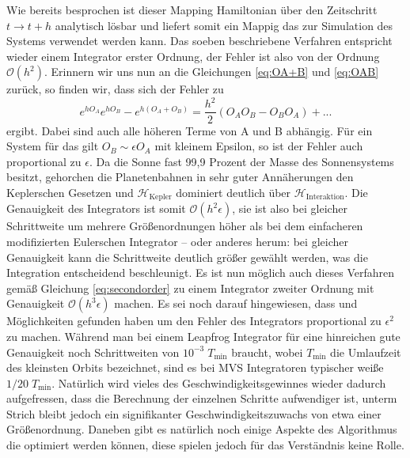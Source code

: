 \documentclass[12pt,a4paper,twoside]{article}
\renewcommand{\H}{\mathcal H}
\begin{document}
Wie bereits besprochen ist dieser Mapping Hamiltonian über den Zeitschritt $t \to t+h$ analytisch lösbar und liefert somit ein Mappig das zur Simulation des Systems verwendet werden kann.
Das soeben beschriebene Verfahren entspricht wieder einem Integrator erster Ordnung, der Fehler ist also von der Ordnung $\mathcal{O}(h^2)$.
Erinnern wir uns nun an die Gleichungen \ref{eq:OA+B} und \ref{eq:OAB} zurück, so finden wir, dass sich der Fehler zu
\begin{equation}
e^{hO_A}e^{hO_B}-e^{h\left(O_A+O_B\right)} = \frac{h^2}{2} \left( O_AO_B-O_BO_A \right) + ...
\end{equation}
ergibt. Dabei sind auch alle höheren Terme von A und B abhängig\cite{Chambers1999}. Für ein System für das gilt $O_B\sim\epsilon O_A$ mit kleinem Epsilon, so ist der Fehler auch proportional zu $\epsilon$.
Da die Sonne fast 99,9 Prozent der Masse des Sonnensystems besitzt, %
gehorchen die Planetenbahnen in sehr guter Annäherungen den Keplerschen Gesetzen und $\H_{\mathrm{Kepler}}$ dominiert deutlich über $\H_{\mathrm{Interaktion}}$. Die Genauigkeit des Integrators ist somit $\mathcal{O}(h^2\epsilon)$, sie ist also bei gleicher Schrittweite um mehrere Größenordnungen höher als bei dem einfacheren modifizierten Eulerschen Integrator – oder anderes herum: bei gleicher Genauigkeit kann die Schrittweite deutlich größer gewählt werden, was die Integration entscheidend beschleunigt. %
Es ist nun möglich auch dieses Verfahren gemäß Gleichung \ref{eq:secondorder} zu einem Integrator zweiter Ordnung  mit Genauigkeit $\mathcal{O}(h^3\epsilon)$ machen. Es sei noch darauf hingewiesen, dass \cite{Saha1992} und \cite{Wisdom1996} Möglichkeiten 
gefunden haben um den Fehler des Integrators proportional zu $\epsilon^2$ zu machen. %
Während man bei einem Leapfrog Integrator für eine hinreichen gute Genauigkeit noch Schrittweiten von $10^{-3}\;T_{\mathrm{min}}$ braucht, wobei $T_{\mathrm{min}}$ die Umlaufzeit des kleinsten Orbits bezeichnet, sind es bei MVS Integratoren typischer weiße $1/20\;T_{\mathrm{min}}$\cite{Duncan1998}. Natürlich wird vieles des Geschwindigkeitsgewinnes wieder dadurch aufgefressen, dass die Berechnung der einzelnen Schritte aufwendiger ist, unterm Strich bleibt jedoch ein signifikanter Geschwindigkeitszuwachs von etwa einer Größenordnung\cite{Chambers1999}.
Daneben gibt es natürlich noch einige Aspekte des Algorithmus die optimiert werden können, diese spielen jedoch für das Verständnis keine Rolle. %

\end{document}
